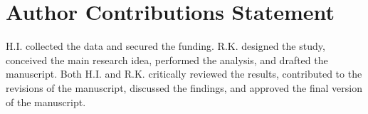 \section*{Author Contributions Statement}
{}
\label{section:authorcontributions}
H.I. collected the data and secured the funding. R.K. designed the study, conceived the main research idea, performed the analysis, and drafted the manuscript. Both H.I. and R.K. critically reviewed the results, contributed to the revisions of the manuscript, discussed the findings, and approved the final version of the manuscript.